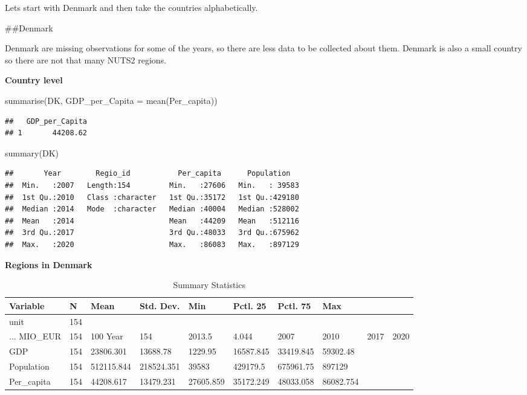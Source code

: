 \documentclass[
]{article}
\newenvironment{Shaded}{\begin{snugshade}}{\end{snugshade}}
\newcommand{\AttributeTok}[1]{\textcolor[rgb]{0.77,0.63,0.00}{#1}}
\newcommand{\FunctionTok}[1]{\textcolor[rgb]{0.00,0.00,0.00}{#1}}
\newcommand{\NormalTok}[1]{#1}
\begin{document}
Lets start with Denmark and then take the countries alphabetically.

\#\#Denmark

Denmark are missing observations for some of the years, so there are
less data to be collected about them. Denmark is also a small country so
there are not that many NUTS2 regions.

\textbf{Country level}

\begin{Shaded}
\begin{Highlighting}[]
    \FunctionTok{summarise}\NormalTok{(DK, }\AttributeTok{GDP\_per\_Capita =} \FunctionTok{mean}\NormalTok{(Per\_capita))}
\end{Highlighting}
\end{Shaded}

\begin{verbatim}
##   GDP_per_Capita
## 1       44208.62
\end{verbatim}

\begin{Shaded}
\begin{Highlighting}[]
\FunctionTok{summary}\NormalTok{(DK)}
\end{Highlighting}
\end{Shaded}

\begin{verbatim}
##       Year        Regio_id           Per_capita      Population    
##  Min.   :2007   Length:154         Min.   :27606   Min.   : 39583  
##  1st Qu.:2010   Class :character   1st Qu.:35172   1st Qu.:429180  
##  Median :2014   Mode  :character   Median :40004   Median :528002  
##  Mean   :2014                      Mean   :44209   Mean   :512116  
##  3rd Qu.:2017                      3rd Qu.:48033   3rd Qu.:675962  
##  Max.   :2020                      Max.   :86083   Max.   :897129
\end{verbatim}

\textbf{Regions in Denmark}

\begin{table}

\caption{\label{tab:unnamed-chunk-3}Summary Statistics}
\centering
\begin{tabular}[t]{llllllll}
\toprule
Variable & N & Mean & Std. Dev. & Min & Pctl. 25 & Pctl. 75 & Max\\
\midrule
unit & 154 &  &  &  &  &  & \\
... MIO_EUR & 154 & 100%
Year & 154 & 2013.5 & 4.044 & 2007 & 2010 & 2017 & 2020\\
GDP & 154 & 23806.301 & 13688.78 & 1229.95 & 16587.845 & 33419.845 & 59302.48\\
Population & 154 & 512115.844 & 218524.351 & 39583 & 429179.5 & 675961.75 & 897129\\
\addlinespace
Per_capita & 154 & 44208.617 & 13479.231 & 27605.859 & 35172.249 & 48033.058 & 86082.754\\
\bottomrule
\end{tabular}
\end{table}
\end{document}
